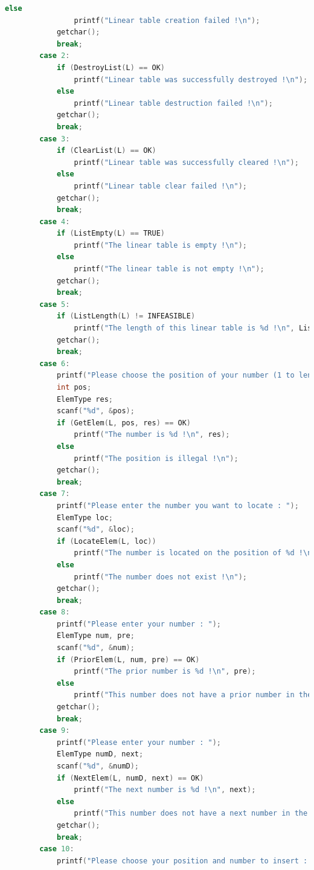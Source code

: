\documentclass[supercite]{Experimental_Report}
\theoremstyle{definition}
\begin{document}
\begin{lstlisting}[language=c]
            else
                printf("Linear table creation failed !\n");
            getchar();
            break;
        case 2:
            if (DestroyList(L) == OK)
                printf("Linear table was successfully destroyed !\n");
            else
                printf("Linear table destruction failed !\n");
            getchar();
            break;
        case 3:
            if (ClearList(L) == OK)
                printf("Linear table was successfully cleared !\n");
            else
                printf("Linear table clear failed !\n");
            getchar();
            break;
        case 4:
            if (ListEmpty(L) == TRUE)
                printf("The linear table is empty !\n");
            else
                printf("The linear table is not empty !\n");
            getchar();
            break;
        case 5:
            if (ListLength(L) != INFEASIBLE)
                printf("The length of this linear table is %d !\n", ListLength(L));
            getchar();
            break;
        case 6:
            printf("Please choose the position of your number (1 to length) : ");
            int pos;
            ElemType res;
            scanf("%d", &pos);
            if (GetElem(L, pos, res) == OK)
                printf("The number is %d !\n", res);
            else
                printf("The position is illegal !\n");
            getchar();
            break;
        case 7:
            printf("Please enter the number you want to locate : ");
            ElemType loc;
            scanf("%d", &loc);
            if (LocateElem(L, loc))
                printf("The number is located on the position of %d !\n", LocateElem(L, loc));
            else
                printf("The number does not exist !\n");
            getchar();
            break;
        case 8:
            printf("Please enter your number : ");
            ElemType num, pre;
            scanf("%d", &num);
            if (PriorElem(L, num, pre) == OK)
                printf("The prior number is %d !\n", pre);
            else
                printf("This number does not have a prior number in the table !\n");
            getchar();
            break;
        case 9:
            printf("Please enter your number : ");
            ElemType numD, next;
            scanf("%d", &numD);
            if (NextElem(L, numD, next) == OK)
                printf("The next number is %d !\n", next);
            else
                printf("This number does not have a next number in the table !\n");
            getchar();
            break;
        case 10:
            printf("Please choose your position and number to insert : ");

\end{lstlisting}
\end{document}

